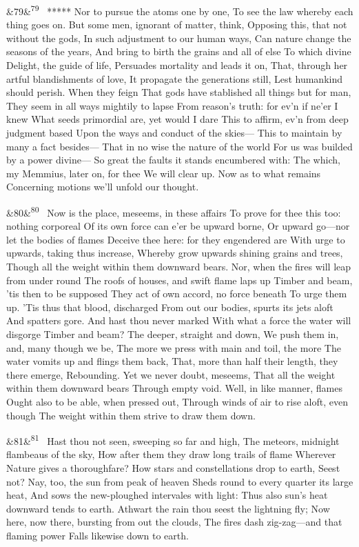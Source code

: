 \documentclass[12pt]{article}
\newcommand{\para}[1][]{\par\noindent\ifx&#1&\else\textsuperscript{\footnotesize #1}~\fi}
\begin{document}
\para[79] ***** Nor to pursue the atoms one by one, To see the law whereby each thing goes on. But some men, ignorant of matter, think, Opposing this, that not without the gods, In such adjustment to our human ways, Can nature change the seasons of the years, And bring to birth the grains and all of else To which divine Delight, the guide of life, Persuades mortality and leads it on, That, through her artful blandishments of love, It propagate the generations still, Lest humankind should perish. When they feign That gods have stablished all things but for man, They seem in all ways mightily to lapse From reason's truth: for ev'n if ne'er I knew What seeds primordial are, yet would I dare This to affirm, ev'n from deep judgment based Upon the ways and conduct of the skies--- This to maintain by many a fact besides--- That in no wise the nature of the world For us was builded by a power divine--- So great the faults it stands encumbered with: The which, my Memmius, later on, for thee We will clear up. Now as to what remains Concerning motions we'll unfold our thought.

\para[80] Now is the place, meseems, in these affairs To prove for thee this too: nothing corporeal Of its own force can e'er be upward borne, Or upward go---nor let the bodies of flames Deceive thee here: for they engendered are With urge to upwards, taking thus increase, Whereby grow upwards shining grains and trees, Though all the weight within them downward bears. Nor, when the fires will leap from under round The roofs of houses, and swift flame laps up Timber and beam, 'tis then to be supposed They act of own accord, no force beneath To urge them up. 'Tis thus that blood, discharged From out our bodies, spurts its jets aloft And spatters gore. And hast thou never marked With what a force the water will disgorge Timber and beam? The deeper, straight and down, We push them in, and, many though we be, The more we press with main and toil, the more The water vomits up and flings them back, That, more than half their length, they there emerge, Rebounding. Yet we never doubt, meseems, That all the weight within them downward bears Through empty void. Well, in like manner, flames Ought also to be able, when pressed out, Through winds of air to rise aloft, even though The weight within them strive to draw them down.

\para[81] Hast thou not seen, sweeping so far and high, The meteors, midnight flambeaus of the sky, How after them they draw long trails of flame Wherever Nature gives a thoroughfare? How stars and constellations drop to earth, Seest not? Nay, too, the sun from peak of heaven Sheds round to every quarter its large heat, And sows the new-ploughed intervales with light: Thus also sun's heat downward tends to earth. Athwart the rain thou seest the lightning fly; Now here, now there, bursting from out the clouds, The fires dash zig-zag---and that flaming power Falls likewise down to earth.
\end{document}
